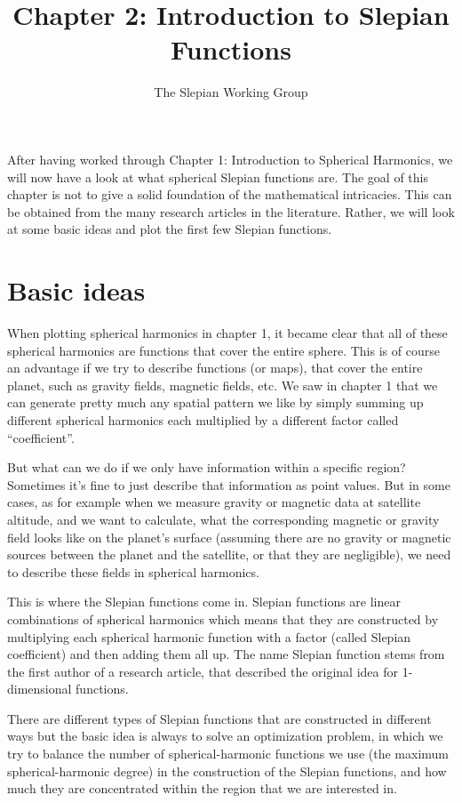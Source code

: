\documentclass[11pt]{article}
\title{Chapter 2: Introduction to Slepian Functions}
\author{The Slepian Working Group}
\begin{document}
\maketitle

After having worked through Chapter 1: Introduction to Spherical
Harmonics, we will now have a look at what spherical Slepian functions
are. The goal of this chapter is not to give a solid foundation of the
mathematical intricacies. This can be obtained from the many research
articles in the literature. Rather, we will look at some basic ideas
and plot the first few Slepian functions.


\section{Basic ideas}
When plotting spherical harmonics in chapter 1, it became clear that
all of these spherical harmonics are functions that cover the entire
sphere. This is of course an advantage if we try to describe functions
(or maps), that cover the entire planet, such as gravity fields,
magnetic fields, etc. We saw in chapter 1 that we can generate pretty
much any spatial pattern we like by simply summing up different
spherical harmonics each multiplied by a different factor called
``coefficient''.

But what can we do if we only have information within a specific
region? Sometimes it's fine to just describe that information as
point values. But in some cases, as for example when we measure
gravity or magnetic data at satellite altitude, and we want to
calculate, what the corresponding magnetic or gravity field looks like
on the planet's surface (assuming there are no gravity or magnetic
sources between the planet and the satellite, or that they are
negligible), we need to describe these fields in spherical harmonics.

This is where the Slepian functions come in. Slepian functions are
linear combinations of spherical harmonics which means that they are
constructed by multiplying each spherical harmonic function with a
factor (called Slepian coefficient) and then adding them all up. The name
Slepian function stems from the first author of a research article,
that described the original idea for 1-dimensional functions.

There are different types of Slepian functions that are constructed in
different ways but the basic idea is always to solve an optimization
problem, in which we try to balance the number of spherical-harmonic
functions we use (the maximum spherical-harmonic degree) in the
construction of the Slepian functions, and how much they are
concentrated within the region that we are interested in.
\end{document}
